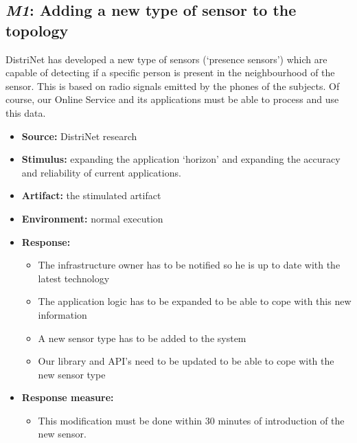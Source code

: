 \documentclass[english]{sareport}
\begin{document}
\subsection{\emph{M1}: Adding a new type of sensor to the topology}
DistriNet has developed a new type of sensors (`presence sensors') which are capable of detecting if a specific person is present in the neighbourhood  of the sensor. This is based on radio signals emitted by the phones of the subjects. Of course, our Online Service and its applications must be able to process and use this data.
\begin{itemize}
    \item \textbf{Source:} DistriNet research
    \item \textbf{Stimulus:} expanding the application `horizon' and expanding the accuracy and reliability of current applications.
    \item \textbf{Artifact:} the stimulated artifact
    \item \textbf{Environment:} normal execution
    \item \textbf{Response:}
        \begin{itemize}
        	\item The infrastructure owner has to be notified so he is up to date with the latest technology
            \item The application logic has to be expanded to be able to cope with this new information
            \item A new sensor type has to be added to the system
            \item Our library and API's need to be updated to be able to cope with the new sensor type
        \end{itemize}

    \item \textbf{Response measure:}
        \begin{itemize}
            \item This modification must be done within 30 minutes of introduction of the new sensor.
        \end{itemize}
\end{itemize}
\end{document}
